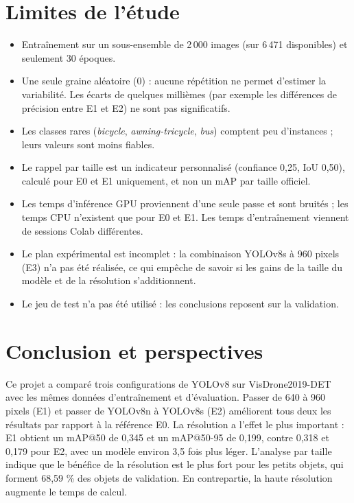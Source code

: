 \documentclass[11pt,a4paper]{article}
\begin{document}
\section{Limites de l'étude}
\label{sec:limites}
\begin{itemize}
  \item Entraînement sur un sous-ensemble de 2\,000 images (sur 6\,471
        disponibles) et seulement 30 époques.
  \item Une seule graine aléatoire (0) : aucune répétition ne permet
        d'estimer la variabilité. Les écarts de quelques millièmes (par
        exemple les différences de précision entre E1 et E2) ne sont pas
        significatifs.
  \item Les classes rares (\emph{bicycle}, \emph{awning-tricycle},
        \emph{bus}) comptent peu d'instances ; leurs valeurs sont moins
        fiables.
  \item Le rappel par taille est un indicateur personnalisé (confiance
        0,25, IoU 0,50), calculé pour E0 et E1 uniquement, et non un mAP
        par taille officiel.
  \item Les temps d'inférence GPU proviennent d'une seule passe et sont
        bruités ; les temps CPU n'existent que pour E0 et E1. Les temps
        d'entraînement viennent de sessions Colab différentes.
  \item Le plan expérimental est incomplet : la combinaison YOLOv8s à 960
        pixels (E3) n'a pas été réalisée, ce qui empêche de savoir si les
        gains de la taille du modèle et de la résolution s'additionnent.
  \item Le jeu de test n'a pas été utilisé : les conclusions reposent sur
        la validation.
\end{itemize}

\section{Conclusion et perspectives}
\label{sec:conclusion}
Ce projet a comparé trois configurations de YOLOv8 sur VisDrone2019-DET avec
les mêmes données d'entraînement et d'évaluation. Passer de 640 à 960 pixels
(E1) et passer de YOLOv8n à YOLOv8s (E2) améliorent tous deux les résultats
par rapport à la référence E0. La résolution a l'effet le plus important :
E1 obtient un mAP@50 de 0,345 et un mAP@50-95 de 0,199, contre 0,318 et 0,179
pour E2, avec un modèle environ 3,5 fois plus léger. L'analyse par taille
indique que le bénéfice de la résolution est le plus fort pour les petits
objets, qui forment 68,59 \% des objets de validation. En contrepartie, la
haute résolution augmente le temps de calcul.
\end{document}
